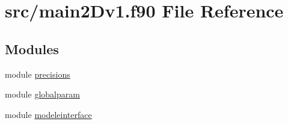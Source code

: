 \hypertarget{main2Dv1_8f90}{}\section{src/main2\+Dv1.f90 File Reference}
\label{main2Dv1_8f90}
\subsection*{Modules}
\begin{DoxyCompactItemize}
\item 
module \mbox{\hyperlink{namespaceprecisions}{precisions}}
\item 
module \mbox{\hyperlink{namespaceglobalparam}{globalparam}}
\item 
module \mbox{\hyperlink{namespacemodeleinterface}{modeleinterface}}
\end{DoxyCompactItemize}
